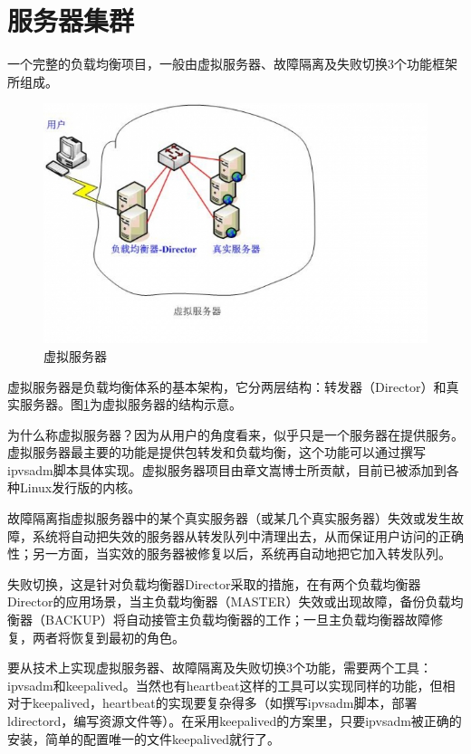 \section{服务器集群}

一个完整的负载均衡项目，一般由虚拟服务器、故障隔离及失败切换3个功能框架所组成。

\begin{figure}[ht]
	\begin{center}
		\includegraphics[keepaspectratio,width=0.5\paperwidth]{Pictures/Network/VirtualServer.jpg}
	\caption{虚拟服务器}
	\label{fig:VirtualServer}
	\end{center}
\end{figure}

虚拟服务器是负载均衡体系的基本架构，它分两层结构：转发器（Director）和真实服务器。图\ref{fig:VirtualServer}为虚拟服务器的结构示意。

为什么称虚拟服务器？因为从用户的角度看来，似乎只是一个服务器在提供服务。虚拟服务器最主要的功能是提供包转发和负载均衡，这个功能可以通过撰写ipvsadm脚本具体实现。虚拟服务器项目由章文嵩博士所贡献，目前已被添加到各种Linux发行版的内核。

故障隔离指虚拟服务器中的某个真实服务器（或某几个真实服务器）失效或发生故障，系统将自动把失效的服务器从转发队列中清理出去，从而保证用户访问的正确性；另一方面，当实效的服务器被修复以后，系统再自动地把它加入转发队列。

失败切换，这是针对负载均衡器Director采取的措施，在有两个负载均衡器Director的应用场景，当主负载均衡器（MASTER）失效或出现故障，备份负载均衡器（BACKUP）将自动接管主负载均衡器的工作；一旦主负载均衡器故障修复，两者将恢复到最初的角色。

要从技术上实现虚拟服务器、故障隔离及失败切换3个功能，需要两个工具：ipvsadm和keepalived。当然也有heartbeat这样的工具可以实现同样的功能，但相对于keepalived，heartbeat的实现要复杂得多（如撰写ipvsadm脚本，部署ldirectord，编写资源文件等）。在采用keepalived的方案里，只要ipvsadm被正确的安装，简单的配置唯一的文件keepalived就行了。


